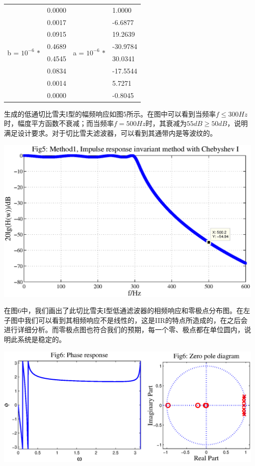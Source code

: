 \documentclass[a4paper,11pt,onecolumn,twoside]{article}
\begin{document}
\vspace{0.2cm}
\begin{center}
\begin{tabular}{|l|l|l|l|}
  \hline
  \multirow{8}{2cm}{b = $10^{-6}$ $\ast$}
                & 0.0000 &
  \multirow{8}{2cm}{a = $10^{-6}$ $\ast$} & 1.0000\\
                & 0.0017 &  & -6.6877\\
                & 0.0915 &  & 19.2639\\
                & 0.4689 &  & -30.9784\\
                & 0.4545 &  & 30.0341\\
                & 0.0834 &  & -17.5544\\
                & 0.0014 &  & 5.7271\\
                & 0.0000 &  & -0.8045\\
  \hline
\end{tabular}
\end{center}
\vspace{0.2cm}

生成的低通切比雪夫I型的幅频响应如图5所示。在图中可以看到当频率$f\leq 300Hz$时，幅度平方函数不衰减；而当频率$f=500Hz$时，其衰减为$55dB\ge 50dB$，说明满足设计要求。对于切比雪夫滤波器，可以看到其通带内是等波纹的。
\begin{center}
    \includegraphics[width=1\textwidth]{fig5.eps}
\end{center}

在图6中，我们画出了此切比雪夫I型低通滤波器的相频响应和零极点分布图。在左子图中我们可以看到其相频响应不是线性的，这是IIR的特点所造成的，在之后会进行详细分析。而零极点图也符合我们的预期，每一个零、极点都在单位圆内，说明此系统是稳定的。
\begin{center}
    \includegraphics[width=1\textwidth]{fig6.eps}
\end{center}
\end{document}
